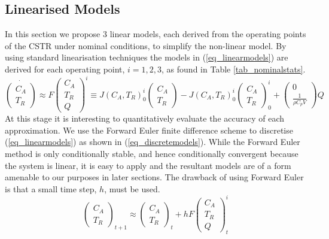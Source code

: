 \documentclass[../masters.tex]{subfiles}
\begin{document}
\subsection{Linearised Models}
In this section we propose 3 linear models, each derived from the operating points of the CSTR under nominal conditions, to simplify the non-linear model. By using standard linearisation techniques the models in (\ref{eq_linearmodels}) are derived for each operating point, $i=1,2,3$, as found in Table \ref{tab_nominalstats}.
\begin{equation}
\dot{\begin{pmatrix}
C_A \\ T_R
\end{pmatrix}} \approx F\begin{pmatrix}
C_A \\ T_R \\ Q
\end{pmatrix}^i \equiv J(C_A, T_R)^i_0\begin{pmatrix}
C_A \\ T_R
\end{pmatrix} - J(C_A, T_R)^i_0\begin{pmatrix}
{C_A} \\ T_R
\end{pmatrix}_0^i + \begin{pmatrix}
0 \\ \frac{1}{\rho C_p V}
\end{pmatrix}Q
\label{eq_linearmodels}
\end{equation}
At this stage it is interesting to quantitatively evaluate the accuracy of each approximation. We use the Forward Euler finite difference scheme to discretise (\ref{eq_linearmodels}) as shown in (\ref{eq_discretemodels}). While the Forward Euler method is only conditionally stable, and hence conditionally convergent because the system is linear, it is easy to apply and the resultant models are of a form amenable to our purposes in later sections. The drawback of using Forward Euler is that a small time step, $h$, must be used.
\begin{equation}
\begin{pmatrix}
C_A \\ T_R
\end{pmatrix}_{t+1} \approx  \begin{pmatrix}
C_A \\ T_R
\end{pmatrix}_{t} + h F\begin{pmatrix}
C_A \\ T_R \\ Q 
\end{pmatrix}_t^i
\label{eq_discretemodels}
\end{equation}
\end{document}
